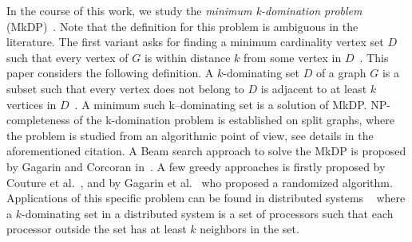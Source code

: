 \documentclass[sigconf]{acmart}
\begin{document}
In the course of this work, we study the \emph{minimum k-domination problem} (MkDP)~\cite{corcoran2021heuristics}.  Note that the definition for this problem is ambiguous in the literature. The first variant asks for finding a minimum cardinality vertex set $ D$ such that every vertex of $G$ is within distance $k$ from some vertex in $D$~\cite{chang1983k}. 
This paper considers the following definition.  A $k$-dominating set  $D$ of a graph $G$ is a subset such that every vertex does not belong to $D$ is adjacent to at least $k$ vertices in  $D$~\cite{lan2013algorithmic}. A minimum such k--dominating set is a solution of MkDP.  NP-completeness of the k-domination problem is established on split graphs, where the problem is studied from an algorithmic point of view, see details in the aforementioned citation. A Beam search approach to solve the MkDP is proposed by Gagarin and Corcoran   in~\cite{corcoran2021heuristics}. A few greedy approaches is firstly  proposed by Couture et al.~\cite{couture2006incremental}, and by Gagarin et al.~\cite{gagarin2013randomized} who proposed a randomized algorithm. 
Applications of this specific problem can be found in  distributed systems  ~\cite{wang2013minimising} where  a $k$-dominating set in a distributed system is a set of processors such that each processor outside the set has at least $k$ neighbors in the set.
\end{document}
